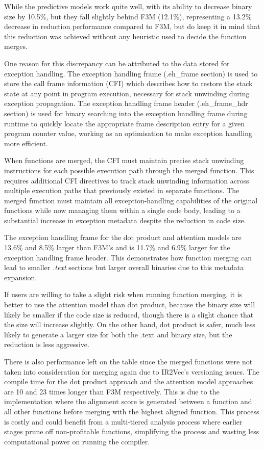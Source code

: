 While the predictive models work quite well, with its ability to decrease binary size by 10.5\%, but they fall slightly behind F3M (12.1\%), representing a 13.2\% decrease in reduction performance compared to F3M, but do keep it in mind that this reduction was achieved without any heuristic used to decide the function merges.

One reason for this discrepancy can be attributed to the data stored for exception handling. The exception handling frame (.eh\_frame section) is used to store the call frame information (CFI) which describes how to restore the stack state at any point in program execution, necessary for stack unwinding during exception propagation. The exception handling frame header (.eh\_frame\_hdr section) is used for binary searching into the exception handling frame during runtime to quickly locate the appropriate frame description entry for a given program counter value, working as an optimisation to make exception handling more efficient.

When functions are merged, the CFI must maintain precise stack unwinding instructions for each possible execution path through the merged function. This requires additional CFI directives to track stack unwinding information across multiple execution paths that previously existed in separate functions. The merged function must maintain all exception-handling capabilities of the original functions while now managing them within a single code body, leading to a substantial increase in exception metadata despite the reduction in code size.

The exception handling frame for the dot product and attention models are 13.6\% and 8.5\% larger than F3M's and is 11.7\% and 6.9\% larger for the exception handling frame header. This demonstrates how function merging can lead to smaller \textit{.text} sections but larger overall binaries due to this metadata expansion.

If users are willing to take a slight risk when running function merging, it is better to use the attention model than dot product, because the binary size will likely be smaller if the code size is reduced, though there is a slight chance that the size will increase slightly. On the other hand, dot product is safer, much less likely to generate a larger size for both the .text and binary size, but the reduction is less aggressive.

There is also performance left on the table since the merged functions were not taken into consideration for merging again due to IR2Vec's versioning issues. The compile time for the dot product approach and the attention model approaches are 10 and 23 times longer than F3M respectively. This is due to the implementation where the alignment score is generated between a function and all other functions before merging with the highest aligned function. This process is costly and could benefit from a multi-tiered analysis process where earlier stages prune off non-profitable functions, simplifying the process and wasting less computational power on running the compiler.